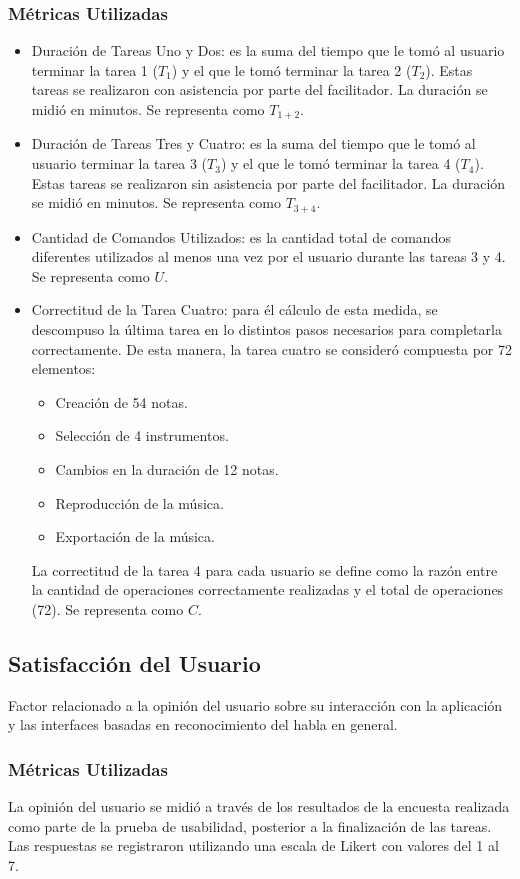 \subsubsection{M\'etricas Utilizadas}
\begin{itemize}
	\item Duraci\'on de Tareas Uno y Dos: es la suma del tiempo que le tom\'o al usuario
	terminar la tarea 1 ($T_1$) y el que le tom\'o terminar la tarea 2 ($T_2$). 
	Estas tareas se realizaron con asistencia por parte del facilitador. 
	La duraci\'on se midi\'o en minutos. Se representa como $T_{1+2}$.
	\item Duraci\'on de Tareas Tres y Cuatro: es la suma del tiempo que le tom\'o al usuario
	terminar la tarea 3 ($T_3$) y el que le tom\'o terminar la tarea 4 ($T_4$). 
	Estas tareas se realizaron sin asistencia por parte del facilitador. 
	La duraci\'on se midi\'o en minutos. Se representa como $T_{3+4}$.
	\item Cantidad de Comandos Utilizados: es la cantidad total de comandos diferentes utilizados
	al menos una vez por el usuario durante las tareas 3 y 4. Se representa como $U$.
	\item Correctitud de la Tarea Cuatro: para \'el c\'alculo de esta medida, se descompuso la
	\'ultima tarea en lo distintos pasos necesarios para completarla correctamente.
	De esta manera, la tarea cuatro se consider\'o compuesta por 72 elementos:
	\begin{itemize}
		\item Creaci\'on de 54 notas.
		\item Selecci\'on de 4 instrumentos.
		\item Cambios en la duraci\'on de 12 notas.
		\item Reproducci\'on de la m\'usica.
		\item Exportaci\'on de la m\'usica.
	\end{itemize}
	La correctitud de la tarea 4 para cada usuario se define como la raz\'on entre la cantidad de operaciones
	correctamente realizadas y el total de operaciones (72). Se representa como $C$.
\end{itemize}

\subsection{Satisfacci\'on del Usuario}
Factor relacionado a la opini\'on del usuario sobre su interacci\'on con la aplicaci\'on y las interfaces
basadas en reconocimiento del habla en general.
\subsubsection{M\'etricas Utilizadas}
La opini\'on del usuario se midi\'o a trav\'es de los resultados de la encuesta realizada como parte de
la prueba de usabilidad, posterior a la finalizaci\'on de las tareas. Las respuestas se
registraron utilizando una escala de Likert \cite{Allen:2007} con valores del 1 al 7.

